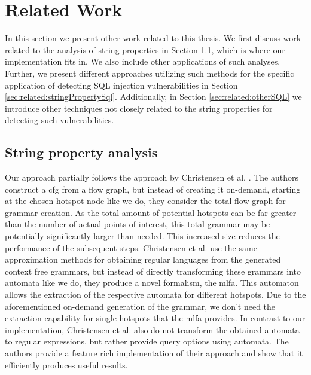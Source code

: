 \chapter{Related Work}
\label{chapter:RelatedWork}

In this section we present other work related to this thesis. We first discuss work related to the analysis of string properties in Section \ref{sec:related:stringproperty}, which is where our implementation fits in. We also include other applications of such analyses. Further, we present different approaches utilizing such methods for the specific application of detecting SQL injection vulnerabilities in Section \ref{sec:related:stringPropertySql}. Additionally, in Section \ref{sec:related:otherSQL} we introduce other techniques not closely related to the string properties for detecting such vulnerabilities.


\section{String property analysis}\label{sec:related:stringproperty}

Our approach partially follows the approach by Christensen et al. \cite{brics}. The authors construct a \acl{cfg} from a flow graph, but instead of creating it on-demand, starting at the chosen hotspot node like we do, they consider the total flow graph for grammar creation.
As the total amount of potential hotspots can be far greater than the number of actual points of interest, this total grammar may be potentially significantly larger than needed. This increased size reduces the performance of the subsequent steps.
Christensen et al. use the same approximation methods for obtaining regular languages from the generated context free grammars, but instead of directly transforming these grammars into automata like we do, they produce a novel formalism, the \ac{mlfa}.
This automaton allows the extraction of the respective automata for different hotspots. Due to the aforementioned on-demand generation of the grammar, we don't need the extraction capability for single hotspots that the \ac{mlfa} provides. In contrast to our implementation, Christensen et al. also do not transform the obtained automata to regular expressions, but rather provide query options using automata.
The authors provide a feature rich implementation of their approach and show that it efficiently produces useful results.

